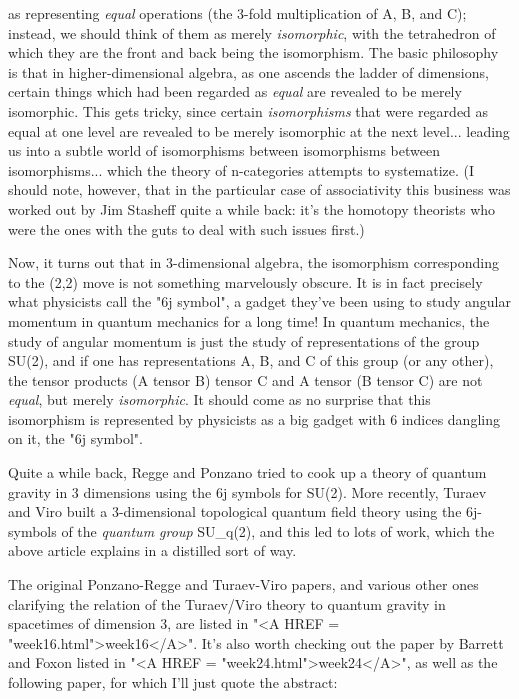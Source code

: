 as representing \emph{equal} operations (the 3-fold multiplication of A, B,
and C); instead, we should think of them as merely \emph{isomorphic}, with
the tetrahedron of which they are the front and back being the
isomorphism.  The basic philosophy is that in higher-dimensional
algebra, as one ascends the ladder of dimensions, certain things which
had been regarded as \emph{equal} are revealed to be merely isomorphic.  This
gets tricky, since certain \emph{isomorphisms} that were regarded as equal 
at one level are revealed to be merely isomorphic at the next level...
leading us into a subtle world of isomorphisms between isomorphisms
between isomorphisms... which the theory of n-categories attempts to
systematize.  (I should note, however, that in the particular case of
associativity this business was worked out by Jim Stasheff quite a
while back: it's the homotopy theorists who were the ones with the guts
to deal with such issues first.)  

Now, it turns out that in 3-dimensional algebra, the isomorphism
corresponding to the (2,2) move is not something marvelously obscure.
It is in fact precisely what physicists call the "6j symbol", a gadget
they've been using to study angular momentum in quantum mechanics for a
long time!  In quantum mechanics, the study of angular momentum is just
the study of representations of the group SU(2), and if one has
representations A, B, and C of this group (or any other), the tensor
products (A tensor B) tensor C and A tensor (B tensor C) are not
\emph{equal}, but merely \emph{isomorphic}.  
It should come as no surprise that
this isomorphism is represented by physicists as a big gadget with 6
indices dangling on it, the "6j symbol".

Quite a while back, Regge and Ponzano tried to cook up a theory of
quantum gravity in 3 dimensions using the 6j symbols for SU(2).  More
recently, Turaev and Viro built a 3-dimensional topological quantum
field theory using the 6j-symbols of the \emph{quantum group} 
SU_{q}(2), and
this led to lots of work, which the above article explains in a
distilled sort of way.

The original Ponzano-Regge and Turaev-Viro papers, and various other
ones clarifying the relation of the Turaev/Viro theory to quantum
gravity in spacetimes of dimension 3, are listed in "<A HREF = "week16.html">week16</A>".  It's also
worth checking out the paper by Barrett and Foxon listed in "<A HREF = "week24.html">week24</A>", as
well as the following paper, for which I'll just quote the abstract:

